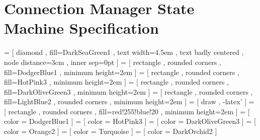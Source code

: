

\chapter{Connection Manager State Machine Specification}

 =
  [ diamond
  , fill=DarkSeaGreen1
  , text width=4.5em
  , text badly centered
  , node distance=3cm
  , inner sep=0pt
  ]
 =
  [ rectangle
  , rounded corners
  , fill=DodgerBlue1
  , minimum height=2em
  ]
 =
  [ rectangle
  , rounded corners
  , fill=HotPink3
  , minimum height=2em
  ]
 =
  [ rectangle
  , rounded corners
  , fill=DarkOliveGreen3
  , minimum height=2em
  ]
 =
  [ rectangle
  , rounded corners
  , fill=LightBlue2
  , rounded corners
  , minimum height=2em
  ]
 =
  [ draw
  , -latex'
  ]
 =
  [ rectangle
  , rounded corners
  , fill=red!255!blue!20
  , minimum height=2em
  ]
      = [ color = DodgerBlue1 ]
       = [ color = HotPink3 ]
 = [ color = DarkOliveGreen3 ]
  = [ color = Orange2 ]
   = [ color = Turquoise ]
    = [ color = DarkOrchid2 ]

\def\TCP{\textsf{TCP}}
\def\ipvfour{\textsf{ipv4}}
\def\ipvsix{\textsf{ipv6}}

